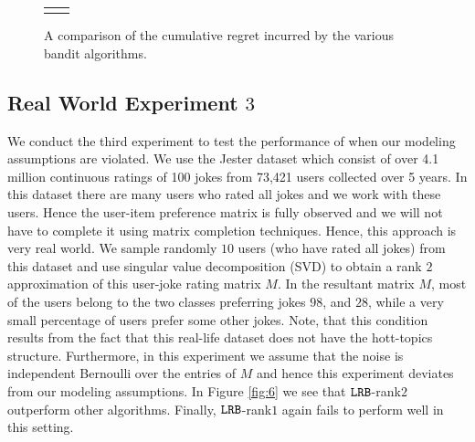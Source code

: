 \begin{figure}[!th]
\begin{tabular}{cc}
{  		\label{fig:4}
    }
    \end{tabular}
    \caption{A comparison of the cumulative regret incurred by the various bandit algorithms. }
    \label{fig:karmed1}
    \vspace*{-1em}
\end{figure}


\subsection{Real World Experiment $3$}
We conduct the third experiment to test the performance of \latentranker when our modeling assumptions are violated. We use the Jester dataset \citep{goldberg2001eigentaste} which consist of over 4.1 million continuous ratings of 100 jokes from 73,421 users collected over 5 years. In this dataset there are many users who rated all jokes and we work with these users. Hence the user-item preference matrix is fully observed and we will not have to complete it using  matrix completion techniques. Hence, this approach is very real world. We sample randomly $10$ users (who have rated all jokes) from this dataset and use singular value decomposition (SVD) to obtain a rank $2$ approximation of this user-joke rating matrix $M$. In the resultant matrix $M$, most of the users belong to the two classes preferring jokes $98$, and $28$, while a very small percentage of users prefer some other jokes. Note, that this condition results from the fact that this real-life dataset does not have the hott-topics structure. Furthermore, in this experiment we assume that the noise is independent Bernoulli over the entries of $M$ and hence this experiment deviates from our modeling assumptions. In Figure \ref{fig:6}  we see that ${\tt LRB}$-rank$2$ outperform other algorithms. Finally, ${\tt LRB}$-rank$1$ again fails to perform well in this setting.
